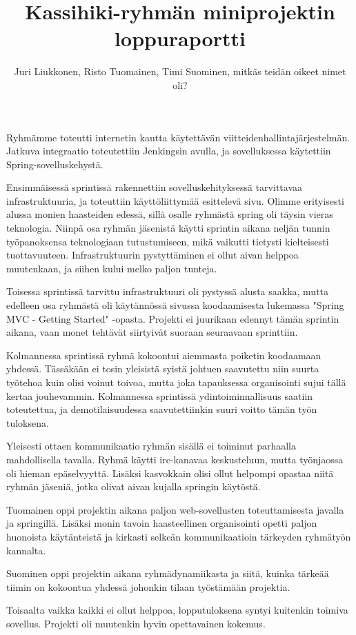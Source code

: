 \documentclass[a4paper]{article}
\author{Juri Liukkonen, Risto Tuomainen, Timi Suominen, mitkäs teidän oikeet nimet oli?}
\title{Kassihiki-ryhmän miniprojektin loppuraportti}
\begin{document}
\maketitle
\noindent
Ryhmämme toteutti internetin kautta käytettävän viitteidenhallintajärjestelmän. Jatkuva integraatio toteutettiin Jenkingsin avulla, ja sovelluksessa käytettiin Spring-sovelluskehystä. 

Ensimmäisessä sprintissä rakennettiin sovelluskehityksessä tarvittavaa infrastruktuuria, ja toteuttiin käyttöliittymää esittelevä sivu. Olimme erityisesti alussa monien haasteiden edessä, sillä osalle ryhmästä spring oli täysin vieras teknologia. Niinpä osa ryhmän jäsenistä käytti sprintin aikana neljän tunnin työpanoksensa teknologiaan tutustumiseen, mikä vaikutti tietysti kielteisesti tuottavuuteen. Infrastruktuurin pystyttäminen ei ollut aivan helppoa muutenkaan, ja siihen kului melko paljon tunteja.  

Toisessa sprintissä tarvittu infrastruktuuri oli pystyssä alusta saakka, mutta edelleen osa ryhmästä oli käytännössä sivussa koodaamisesta lukemassa "Spring MVC - Getting Started" -opasta. Projekti ei juurikaan edennyt tämän sprintin aikana, vaan monet tehtävät siirtyivät suoraan seuraavaan sprinttiin. 

Kolmannessa sprintissä ryhmä kokoontui aiemmasta poiketin koodaamaan yhdessä. Tässäkään ei tosin yleisistä syistä johtuen saavutettu niin suurta työtehoa kuin olisi voinut toivoa, mutta joka tapauksessa organisointi sujui tällä kertaa jouhevammin. Kolmannessa sprintissä ydintoiminnallisuus saatiin toteutettua, ja demotilaisuudessa saavutettiinkin suuri voitto tämän työn tuloksena.

Yleisesti ottaen kommunikaatio ryhmän sisällä ei toiminut parhaalla mahdollisella tavalla. Ryhmä käytti irc-kanavaa keskusteluun, mutta työnjaossa oli hieman epäselvyyttä. Lisäksi kasvokkain olisi ollut helpompi opastaa niitä ryhmän jäseniä, jotka olivat aivan kujalla springin käytöstä.  


Tuomainen oppi projektin aikana paljon web-sovellusten toteuttamisesta javalla ja springillä. Lisäksi monin tavoin haasteellinen organisointi opetti paljon huonoista käytänteistä ja kirkasti selkeän kommunikaatioin tärkeyden ryhmätyön kannalta. 

Suominen oppi projektin aikana ryhmädynamiikasta ja siitä, kuinka tärkeää tiimin on kokoontua yhdessä johonkin tilaan työstämään projektia.

Toisaalta vaikka kaikki ei ollut helppoa, lopputuloksena syntyi kuitenkin toimiva sovellus. Projekti oli muutenkin hyvin opettavainen kokemus.
\end{document}

